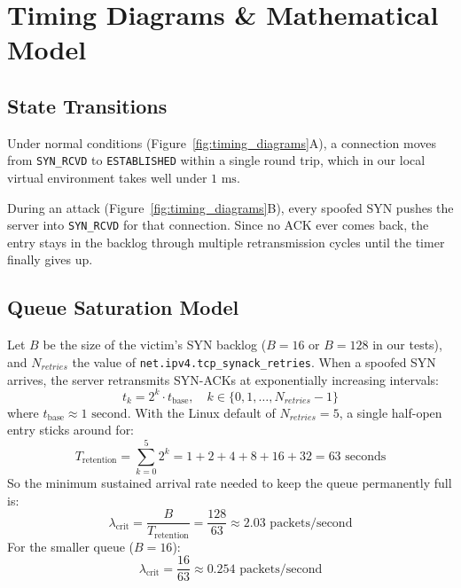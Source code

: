 \documentclass[11pt,a4paper]{report}
\begin{document}
\chapter{Timing Diagrams \& Mathematical Model}

\section{State Transitions}
Under normal conditions (Figure~\ref{fig:timing_diagrams}A), a connection moves from \texttt{SYN\_RCVD} to \texttt{ESTABLISHED} within a single round trip, which in our local virtual environment takes well under $1\text{ ms}$.

During an attack (Figure~\ref{fig:timing_diagrams}B), every spoofed SYN pushes the server into \texttt{SYN\_RCVD} for that connection. Since no ACK ever comes back, the entry stays in the backlog through multiple retransmission cycles until the timer finally gives up.

\section{Queue Saturation Model}
Let $B$ be the size of the victim's SYN backlog ($B = 16$ or $B = 128$ in our tests), and $N_{retries}$ the value of \texttt{net.ipv4.tcp\_synack\_retries}. When a spoofed SYN arrives, the server retransmits SYN-ACKs at exponentially increasing intervals:
\begin{equation}
    t_k = 2^k \cdot t_{\text{base}}, \quad k \in \{0, 1, \dots, N_{retries}-1\}
\end{equation}
where $t_{\text{base}} \approx 1\text{ second}$. With the Linux default of $N_{retries} = 5$, a single half-open entry sticks around for:
\begin{equation}
    T_{\text{retention}} = \sum_{k=0}^{5} 2^k = 1 + 2 + 4 + 8 + 16 + 32 = 63\text{ seconds}
\end{equation}
So the minimum sustained arrival rate needed to keep the queue permanently full is:
\begin{equation}
    \lambda_{\text{crit}} = \frac{B}{T_{\text{retention}}} = \frac{128}{63} \approx 2.03\text{ packets/second}
\end{equation}
For the smaller queue ($B = 16$):
\begin{equation}
    \lambda_{\text{crit}} = \frac{16}{63} \approx 0.254\text{ packets/second}
\end{equation}
\end{document}
